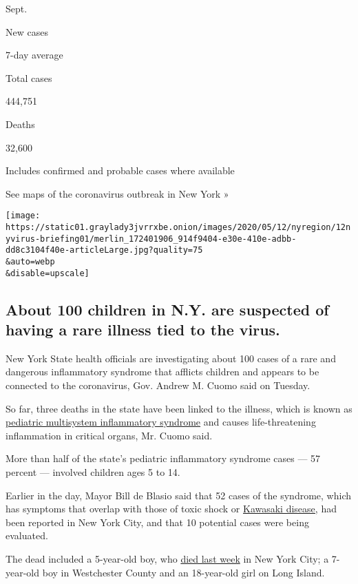 Sept.

New cases

7-day average

Total cases

444,751

Deaths

32,600

Includes confirmed and probable cases where available

See maps of the coronavirus outbreak in New York »

\texttt{[image: https://static01.graylady3jvrrxbe.onion/images/2020/05/12/nyregion/12nyvirus-briefing01/merlin\_172401906\_914f9404-e30e-410e-adbb-dd8c3104f40e-articleLarge.jpg?quality=75\\\&auto=webp\\\&disable=upscale]}

\hypertarget{about-100-children-in-ny-are-suspected-of-having-a-rare-illness-tied-to-the-virus}{%
\subsection{About 100 children in N.Y. are suspected of having a rare
illness tied to the
virus.}\label{about-100-children-in-ny-are-suspected-of-having-a-rare-illness-tied-to-the-virus}}

New York State health officials are investigating about 100 cases of a
rare and dangerous inflammatory syndrome that afflicts children and
appears to be connected to the coronavirus, Gov. Andrew M. Cuomo said on
Tuesday.

So far, three deaths in the state have been linked to the illness, which
is known as
\href{https://www.nytimes3xbfgragh.onion/article/kawasaki-disease-coronavirus-children.html?module=inline}{pediatric
multisystem inflammatory syndrome} and causes life-threatening
inflammation in critical organs, Mr. Cuomo said.

More than half of the state's pediatric inflammatory syndrome cases ---
57 percent --- involved children ages 5 to 14.

Earlier in the day, Mayor Bill de Blasio said that 52 cases of the
syndrome, which has symptoms that overlap with those of toxic shock or
\href{https://www.heart.org/en/health-topics/kawasaki-disease}{Kawasaki
disease,} had been reported in New York City, and that 10 potential
cases were being evaluated.

The dead included a 5-year-old boy, who
\href{https://www.nytimes3xbfgragh.onion/2020/05/08/nyregion/child-dead-new-virus-kawasaki.html?module=inline}{died
last week} in New York City; a 7-year-old boy in Westchester County and
an 18-year-old girl on Long Island.

